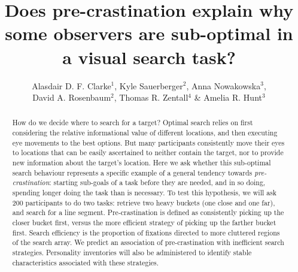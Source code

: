 \documentclass[]{rsos}
\begin{document}
\title{Does pre-crastination explain why some observers are sub-optimal in a visual search task?}

\author{Alasdair D. F. Clarke$^{1}$, Kyle Sauerberger$^{2}$, Anna Nowakowska$^{3}$,\\ David A. Rosenbaum$^{2}$, Thomas R. Zentall$^{4}$ \& Amelia R. Hunt$^{3}$}

\address{$^{1}$Dept. of Psychology, University of Essex, UK\\
$^{2}$Dept. of Psychology, University of California, USA\\
$^{3}$School of Psychology, University of Aberdeen, UK\\
$^{4}$Dept. of Psychology, University of Kentucky, USA}

\subject{Psychology}




\begin{abstract}
How do we decide where to search for a target? Optimal search relies on first considering the relative informational value of different locations, and then executing eye movements to the best options. But many participants consistently move their eyes to locations that can be easily ascertained to neither contain the target, nor to provide new information about the target's location. Here we ask whether this sub-optimal search behaviour represents a specific example of a general tendency towards \textit{pre-crastination}: starting sub-goals of a task before they are needed, and in so doing, spending longer doing the task than is necessary. To test this hypothesis, we will ask 200 participants to do two tasks: retrieve two heavy buckets (one close and one far), and search for a line segment. Pre-crastination is defined as consistently picking up the closer bucket first, versus the more efficient strategy of picking up the farther bucket first. Search efficiency is the proportion of fixations directed to more cluttered regions of the search array. We predict an association of pre-crastination with inefficient search strategies. Personality inventories will also be administered to identify stable characteristics associated with these strategies. 
\end{abstract}
\end{document}
